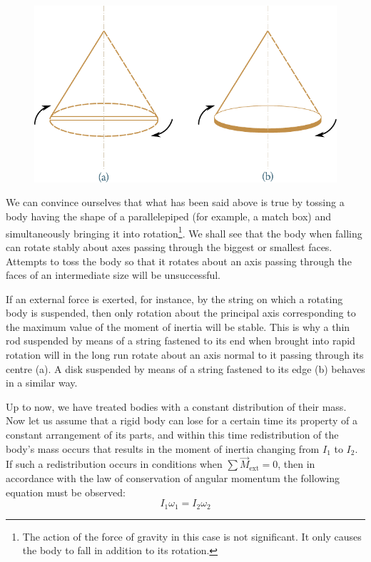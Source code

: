 \begin{figure}[t]
	\begin{center}
		\includegraphics[scale=0.9]{figures/ch_05/fig_5_10.pdf}
		\caption[]{}
		\label{fig:5_10}
	\end{center}
\vspace{-1.0cm}
\end{figure}

We can convince ourselves that what has been said above is true by tossing a body having the shape of a parallelepiped (for example, a match box) and simultaneously bringing it into rotation\footnote{The action of the force of gravity in this case is not significant. It only causes the body to fall in addition to its rotation.}. We shall see that the body when falling can rotate stably about axes passing through the biggest or smallest faces. Attempts to toss the body so that it rotates about an axis passing through the faces of an intermediate size will be unsuccessful.

If an external force is exerted, for instance, by the string on which a rotating body is suspended, then only rotation about the principal axis corresponding to the maximum value of the moment of inertia will be stable. This is why a thin rod suspended by means of a string fastened to its end when brought into rapid rotation will in the long run rotate about an axis normal to it passing through its centre (a). A disk suspended by means of a string fastened to its edge (b) behaves in a similar way.

Up to now, we have treated bodies with a constant distribution of their mass. Now let us assume that a rigid body can lose for a certain time its property of a constant arrangement of its parts, and within this time redistribution of the body's mass occurs that results in the moment of inertia changing from $I_1$ to $I_2$. If such a redistribution occurs in conditions when $\sum\vec{M}_{\text{ext}}=0$, then in accordance with the law of conservation of angular momentum the following equation must be observed:
\begin{equation}\label{eq:5_16}
I_1\omega_1 = I_2\omega_2
\end{equation}

